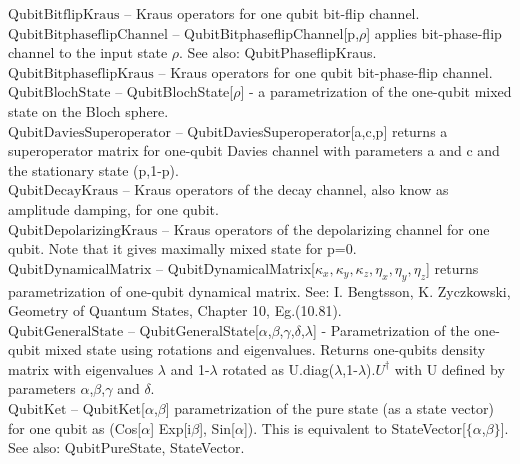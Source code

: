 \documentclass[a4paper,10pt]{scrartcl}
\begin{document}
\textbf{$ \text{QubitBitflipKraus} $ }-- Kraus operators for one qubit bit-flip channel.$  $\\

\textbf{$ \text{QubitBitphaseflipChannel} $ }-- QubitBitphaseflipChannel[p,$\rho $] applies bit-phase-flip channel to the input state $\rho $. See also: QubitPhaseflipKraus.$  $\\

\textbf{$ \text{QubitBitphaseflipKraus} $ }-- Kraus operators for one qubit bit-phase-flip channel.$  $\\

\textbf{$ \text{QubitBlochState} $ }-- QubitBlochState[$\rho $] - a parametrization of the one-qubit mixed state on the Bloch sphere.$  $\\

\textbf{$ \text{QubitDaviesSuperoperator} $ }-- QubitDaviesSuperoperator[a,c,p] returns a superoperator matrix for one-qubit Davies channel with parameters a and c and the stationary state (p,1-p).$  $\\

\textbf{$ \text{QubitDecayKraus} $ }-- Kraus operators of the decay channel, also know as amplitude damping, for one qubit.$  $\\

\textbf{$ \text{QubitDepolarizingKraus} $ }-- Kraus operators of the depolarizing channel for one qubit. Note that it gives maximally mixed state for p=0.$  $\\

\textbf{$ \text{QubitDynamicalMatrix} $ }-- QubitDynamicalMatrix[$ \kappa _x,\kappa _y,\kappa _z,\eta _x,\eta _y,\eta _z $] returns parametrization of one-qubit dynamical matrix. See: I. Bengtsson, K. Zyczkowski, Geometry of Quantum States, Chapter 10, Eg.(10.81).$  $\\

\textbf{$ \text{QubitGeneralState} $ }-- QubitGeneralState[$\alpha $,$\beta $,$\gamma $,$\delta $,$\lambda $] - Parametrization of the one-qubit mixed state using rotations and eigenvalues. Returns one-qubits density matrix with eigenvalues $\lambda $ and 1-$\lambda $ rotated as U.diag($\lambda $,1-$\lambda $).$ U^{\dagger } $ with U defined by parameters $\alpha $,$\beta $,$\gamma $ and $\delta $.$  $\\

\textbf{$ \text{QubitKet} $ }-- QubitKet[$\alpha $,$\beta $] parametrization of the pure state (as a state vector) for one qubit as (Cos[$\alpha $] Exp[i$\beta $], Sin[$\alpha $]). This is equivalent to StateVector[$\{\alpha $,$\beta \}$]. See also: QubitPureState, StateVector.$  $\\
\end{document}
